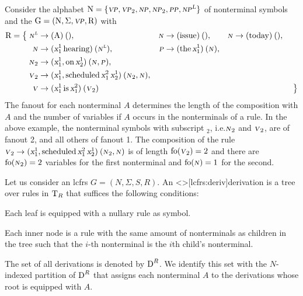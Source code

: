 \documentclass[../document.tex]{subfiles}
\begin{document}
    \begin{example}\label{ex:lcfrs:rules}
        Consider the alphabet \(\mathrm{N} = \{\textsc{\textsl{vp}}, \textsc{\textsl{vp}}_2, \textsc{\textsl{np}}, \textsc{\textsl{np}}_2, \textsc{\textsl{pp}}, \textsc{\textsl{np}}^{\textsc{\textsl{L}}}\}\) of nonterminal symbols and the  \(\mathrm{G} = (\mathrm{N}, \Sigma, \textsc{\textsl{vp}}, \mathrm{R})\) with
        \begin{align*}
            \mathrm{R} = \big\{\;
                \textsc{\textsl{n}}^{\textsc{\textsl{l}}} &\to (\text{A})\:(), &\textsc{\textsl{n}} &\to (\text{issue})\:(), &\textsc{\textsl{n}} &\to (\text{today})\:(), &\\
                \textsc{\textsl{n}} &\to (\textsl{x}_1^1 \, \text{hearing})\:(\textsc{\textsl{n}}^{\textsc{\textsl{l}}}), &\textsc{\textsl{p}} &\to (\text{the}\,\textsl{x}_1^1)\:(\textsc{\textsl{n}}), \\
                \textsc{\textsl{n}}_2 &\to (\textsl{x}_1^1, \text{on} \, \textsl{x}_2^1)\:(\textsc{\textsl{n}}, \textsc{\textsl{p}}), \\
                \textsc{\textsl{v}}_2 &\to (\textsl{x}_1^1, \text{scheduled} \, \textsl{x}_1^2 \, \textsl{x}_2^1)\:(\textsc{\textsl{n}}_2, \textsc{\textsl{n}}), \\
                \textsc{\textsl{v}} &\to (\textsl{x}_1^1 \, \text{is} \, \textsl{x}_1^2)\:(\textsc{\textsl{v}}_2)
            &&&&&\;\big\}
        \end{align*}
        The fanout for each nonterminal \(A\) determines the length of the composition with  \(A\) and the number of variables if \(A\) occurs in the  nonterminals of a rule.
        In the above example, the nonterminal symbols with subscript \(_2\), i.e.\@ \(\textsc{\textsl{n}}_2\) and \(\textsc{\textsl{v}}_2\), are of fanout 2, and all others of fanout 1.
        The composition of the rule \(\textsc{\textsl{v}}_2 \to (\textsl{x}_1^1, \text{scheduled} \, \textsl{x}_1^2 \, \textsl{x}_2^1)\:(\textsc{\textsl{n}}_2, \textsc{\textsl{n}})\) is of length \(\operatorname{fo}(\textsc{\textsl{v}}_2) = 2\) and there are \(\operatorname{fo}(\textsc{\textsl{n}}_2) = 2\) variables for the first  nonterminal and \(\operatorname{fo}(\textsc{\textsl{n}}) = 1\) for the second.
    \end{example}

    \begin{definition}[Derivation]
        Let us consider an lcfrs \(G = (N, \varSigma, S, R)\).
        An  <\lcfrs>[lcfrs:deriv]{derivation} is a tree over rules in \(\operatorname{T}_R\) that suffices the following conditions:
        \begin{compactitem}
            \item Each leaf is equipped with a nullary rule as symbol.
            \item Each inner node is a rule with the same amount of  nonterminals as children in the tree such that the \(i\)-th  nonterminal is the \(i\)th child's  nonterminal.
        \end{compactitem}
        The set of all  derivations is denoted by \(\operatorname{D}^R\).
        We identify this set with the \(N\)-indexed partition of \(\operatorname{D}^R\) that assigns each nonterminal \(A\) to the derivations whose root is equipped with  \(A\).
    \end{definition}
\end{document}
